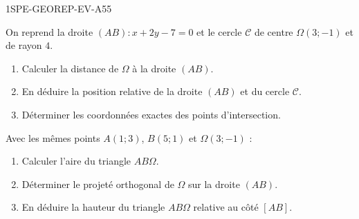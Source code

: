 \begin{evaluation}{1SPE-GEOREP-EV-A}{55}


On reprend la droite $(AB) : x + 2y - 7 = 0$ et le cercle $\mathcal{C}$ de centre $\Omega(3 ; -1)$ et de rayon $4$.

\begin{enumerate}
  \item Calculer la distance de $\Omega$ à la droite $(AB)$.
  \item En déduire la position relative de la droite $(AB)$ et du cercle $\mathcal{C}$.
  \item Déterminer les coordonnées exactes des points d'intersection.
\end{enumerate}



Avec les mêmes points $A(1 ; 3)$, $B(5 ; 1)$ et $\Omega(3 ; -1)$ :

\begin{enumerate}
  \item Calculer l'aire du triangle $AB\Omega$.
  \item Déterminer le projeté orthogonal de $\Omega$ sur la droite $(AB)$.
  \item En déduire la hauteur du triangle $AB\Omega$ relative au côté $[AB]$.
\end{enumerate}

\end{evaluation}
